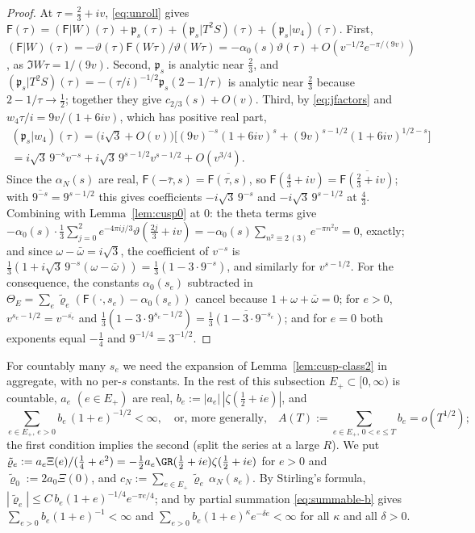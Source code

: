 \begin{proof}
At $\tau=\frac23+iv$, \eqref{eq:unroll} gives $\mathsf F(\tau)=(\mathsf F|W)(\tau)+\mathfrak p_s(\tau)+(\mathfrak p_s|T^2S)(\tau)+(\mathfrak p_s|w_4)(\tau)$. First,
$(\mathsf F|W)(\tau)=-\vartheta(\tau)\mathsf F(W\tau)/\vartheta(W\tau)=-\alpha_0(s)\vartheta(\tau)+O(v^{-1/2}e^{-\pi/(9v)})$, as $\Im W\tau=1/(9v)$. Second,
$\mathfrak p_s$ is analytic near $\frac23$, and $(\mathfrak p_s|T^2S)(\tau)=-(\tau/i)^{-1/2}\mathfrak p_s(2-1/\tau)$ is analytic near $\frac23$ because
$2-1/\tau\to\frac12$; together they give $c_{2/3}(s)+O(v)$. Third, by \eqref{eq:jfactors} and $w_4\tau/i=9v/(1+6iv)$, which has positive real
part,
\begin{multline*}
(\mathfrak p_s|w_4)(\tau)=\big(i\sqrt3+O(v)\big)\Big[(9v)^{-s}(1+6iv)^{s}+(9v)^{s-1/2}(1+6iv)^{1/2-s}\Big]\\
=i\sqrt3\,9^{-s}v^{-s}+i\sqrt3\,9^{s-1/2}v^{s-1/2}+O(v^{3/4}).
\end{multline*}
Since the $\alpha_N(s)$ are real, $\mathsf F(-\bar\tau,s)=\overline{\mathsf F(\tau,s)}$, so $\mathsf F(\frac43+iv)=\overline{\mathsf F(\frac23+iv)}$; with
$\overline{9^{-s}}=9^{s-1/2}$ this gives coefficients $-i\sqrt3\,9^{-s}$ and $-i\sqrt3\,9^{s-1/2}$ at $\frac43$. Combining with
Lemma~\ref{lem:cusp0} at $0$: the theta terms give $-\alpha_0(s)\cdot\frac13\sum_{j=0}^2e^{-4\pi ij/3}\vartheta(\frac{2j}3+iv)=-\alpha_0(s)\sum_{n^2\equiv2\,(3)}e^{-\pi n^2v}=0$,
exactly; and since $\omega-\bar\omega=i\sqrt3$, the coefficient of $v^{-s}$ is $\frac13(1+i\sqrt3\,9^{-s}(\omega-\bar\omega))=\frac13(1-3\cdot9^{-s})$, and similarly
for $v^{s-1/2}$. For the consequence, the constants $\alpha_0(s_e)$ subtracted in $\Theta_E=\sum_e\tilde\varrho_e(\mathsf F(\cdot,s_e)-\alpha_0(s_e))$ cancel because
$1+\omega+\bar\omega=0$; for $e>0$, $v^{s_e-1/2}=v^{-\overline{s_e}}$ and $\frac13(1-3\cdot9^{s_e-1/2})=\overline{\frac13(1-3\cdot9^{-s_e})}$; and for $e=0$ both
exponents equal $-\frac14$ and $9^{-1/4}=3^{-1/2}$.
\end{proof}

For countably many $s_e$ we need the expansion of Lemma~\ref{lem:cusp-class2} in aggregate, with no per-$s$ constants. In the rest of
this subsection $E_+\subset[0,\infty)$ is countable, $a_e$ $(e\in E_+)$ are real, $b_e:=|a_e|\,|\zeta(\frac12+ie)|$, and
\begin{equation}\label{eq:summable-b}
\sum_{e\in E_+,\,e>0}b_e\,(1+e)^{-1/2}<\infty,\quad\text{or, more generally,}\quad A(T):=\sum_{e\in E_+,\,0<e\le T}b_e=o(T^{1/2});
\end{equation}
the first condition implies the second (split the series at a large $R$). We put $\tilde\varrho_e:=a_e\Xi(e)/(\frac14+e^2)=-\frac12a_e\GR(\frac12+ie)\zeta(\frac12+ie)$
for $e>0$ and $\tilde\varrho_0:=2a_0\Xi(0)$, and $c_N:=\sum_{e\in E_+}\tilde\varrho_e\,\alpha_N(s_e)$. By Stirling's formula,
$|\tilde\varrho_e|\le C\,b_e(1+e)^{-1/4}e^{-\pi e/4}$; and by partial summation \eqref{eq:summable-b} gives $\sum_{e>0}b_e(1+e)^{-1}<\infty$ and
$\sum_{e>0}b_e(1+e)^{\kappa}e^{-\delta e}<\infty$ for all $\kappa$ and all $\delta>0$.

